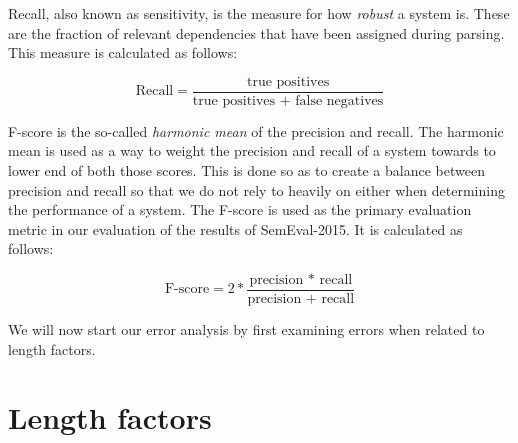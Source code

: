 Recall, also known as sensitivity, is the measure for how \textit{robust} a system is. These are the fraction of relevant dependencies that have been assigned during parsing. This measure is calculated as follows:

\begin{equation*}
    \text{Recall} = \frac{\text{true positives}}{\text{true positives + false
            negatives}}
\end{equation*}

\vspace{1ex}

F-score is the so-called \textit{harmonic mean} of the precision and recall. The harmonic mean is used as a way to weight the precision and recall of a system towards to lower end of both those scores. This is done so as to create a balance between precision and recall so that we do not rely to heavily on either when determining the performance of a system. The F-score is used as the primary evaluation metric in our evaluation of the results of SemEval-2015. It is calculated as follows:

\begin{equation*}
    \text{F-score} = 2*\frac{\text{precision * recall}}{\text{precision + recall}}
\end{equation*}




\vspace{1ex}

We will now start our error analysis by first examining errors when related to length factors.
    
\section{Length factors}

